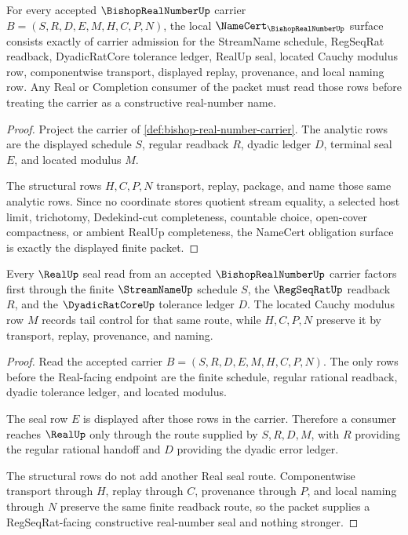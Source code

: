 \begin{theorem}
\label{thm:bishop-real-number-namecert-obligations}
For every accepted $\BishopRealNumberUp$ carrier $B=(S,R,D,E,M,H,C,P,N)$, the local $\NameCert_{\BishopRealNumberUp}$ surface consists exactly of carrier admission for the StreamName schedule, RegSeqRat readback, DyadicRatCore tolerance ledger, RealUp seal, located Cauchy modulus row, componentwise transport, displayed replay, provenance, and local naming row. Any Real or Completion consumer of the packet must read those rows before treating the carrier as a constructive real-number name.
\end{theorem}
\begin{proof}
Project the carrier of \autoref{def:bishop-real-number-carrier}. The analytic rows are the displayed schedule $S$, regular readback $R$, dyadic ledger $D$, terminal seal $E$, and located modulus $M$.

The structural rows $H,C,P,N$ transport, replay, package, and name those same analytic rows. Since no coordinate stores quotient stream equality, a selected host limit, trichotomy, Dedekind-cut completeness, countable choice, open-cover compactness, or ambient RealUp completeness, the NameCert obligation surface is exactly the displayed finite packet.
\end{proof}

\begin{theorem}
\label{thm:bishop-real-number-regseqrat-seal}
Every $\RealUp$ seal read from an accepted $\BishopRealNumberUp$ carrier factors first through the finite $\StreamNameUp$ schedule $S$, the $\RegSeqRatUp$ readback $R$, and the $\DyadicRatCoreUp$ tolerance ledger $D$. The located Cauchy modulus row $M$ records tail control for that same route, while $H,C,P,N$ preserve it by transport, replay, provenance, and naming.
\end{theorem}
\begin{proof}
Read the accepted carrier $B=(S,R,D,E,M,H,C,P,N)$. The only rows before the Real-facing endpoint are the finite schedule, regular rational readback, dyadic tolerance ledger, and located modulus.

The seal row $E$ is displayed after those rows in the carrier. Therefore a consumer reaches $\RealUp$ only through the route supplied by $S,R,D,M$, with $R$ providing the regular rational handoff and $D$ providing the dyadic error ledger.

The structural rows do not add another Real seal route. Componentwise transport through $H$, replay through $C$, provenance through $P$, and local naming through $N$ preserve the same finite readback route, so the packet supplies a RegSeqRat-facing constructive real-number seal and nothing stronger.
\end{proof}

